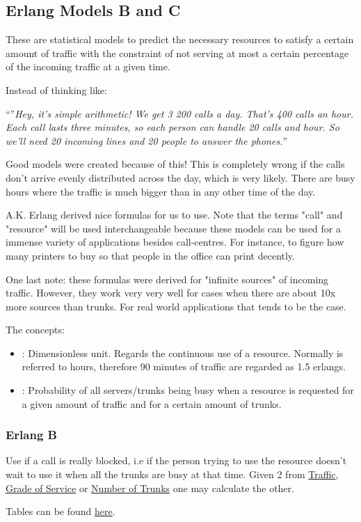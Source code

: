 \subsection{Erlang Models B and C}
\par These are statistical models to predict the necessary resources to satisfy a certain amount of traffic with the constraint of not serving at most a certain percentage of the incoming traffic at a given time. 
\par Instead of thinking like:
\begin{center}
    ``''\textit{Hey, it's simple arithmetic! We get 3 200 calls a day. That's 400 calls an hour. Each call lasts three minutes, so each person can handle 20 calls and hour. So we'll need 20 incoming  lines and 20 people to answer the phones.}''
\end{center}
Good models were created because of this! This is completely wrong if the calls don't arrive evenly distributed across the day, which is very likely. There are busy hours where the traffic is much bigger than in any other time of the day. 
\par A.K. Erlang derived nice formulas for us to use. Note that the terms "call" and "resource" will be used interchangeable because these models can be used for a immense variety of applications besides call-centres. For instance, to figure how many printers to buy so that people in the office can print decently.
\par One last note: these formulas were derived for "infinite sources" of incoming traffic. However, they work very very well for cases when there are about 10x more sources than trunks. For real world applications that tends to be the case. 

\par The concepts:
\begin{itemize}
    \item {}: Dimensionless unit. Regards the continuous use of a resource. Normally is referred to hours, therefore 90 minutes of traffic are regarded as 1.5 erlangs.
    \item {}: Probability of all servers/trunks being busy when a resource is requested for a given amount of traffic and for a certain amount of trunks.
\end{itemize}


\subsubsection*{Erlang B}
Use if a call is really blocked, i.e if the person trying to use the resource doesn't wait to use it when all the trunks are busy at that time. Given 2 from \ul{Traffic}, \ul{Grade of Service} or \ul{Number of Trunks} one may calculate the other.
\par Tables can be found \href{https://onlinelibrary.wiley.com/doi/pdf/10.1002/0470862696.app5}{here}.

